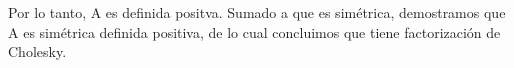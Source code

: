 Por lo tanto, A es definida positva. Sumado a que es simétrica, demostramos que A es simétrica definida positiva, de lo cual concluimos que tiene factorización de Cholesky.\\










